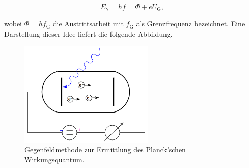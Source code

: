 \begin{equation}
    E_\gamma = hf = \Phi + eU_\text{G},
\label{eqn:Energiebilanz2}
\end{equation}

\noindent wobei $\Phi = hf_\text{G}$ die Austrittsarbeit mit $f_\text{G}$ als Grenzfrequenz bezeichnet. Eine Darstellung dieser Idee liefert die folgende Abbildung.

\begin{figure}
    \centering
    \includegraphics[height=5cm]{Gegenfeldmethode.png}
    \caption{Gegenfeldmethode zur Ermittlung des Planck'schen Wirkungsquantum\cite{Versuchsanleitung_v500}.}
    \label{fig:Gegenfeldmethode}
\end{figure}


